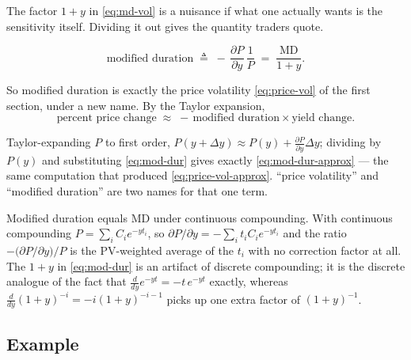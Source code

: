 
The factor $1+y$ in \eqref{eq:md-vol} is a nuisance if what one actually wants is the sensitivity itself.
Dividing it out gives the quantity traders quote.

\begin{definition}
	\begin{equation}
		\text{modified duration} \;\triangleq\; -\,\frac{\partial P}{\partial y}\,\frac{1}{P}
		\;=\; \frac{\mathrm{MD}}{1+y}. \label{eq:mod-dur}
	\end{equation}
\end{definition}

So modified duration is exactly the price volatility \eqref{eq:price-vol} of the first section, under a new name.
By the Taylor expansion,
\begin{equation}
	\text{percent price change} \;\approx\; -\,\text{modified duration} \times \text{yield change}. \label{eq:mod-dur-approx}
\end{equation}

\suppstart
\begin{note}
	Taylor-expanding $P$ to first order, $P(y+\Delta y)\approx P(y)+\frac{\partial P}{\partial y}\Delta y$; dividing by $P(y)$ and substituting \eqref{eq:mod-dur} gives exactly \eqref{eq:mod-dur-approx} --- the same computation that produced \eqref{eq:price-vol-approx}.
	 ``price volatility'' and ``modified duration'' are two names for that one term.
\end{note}
\suppend

\begin{note}
	Modified duration equals MD under continuous compounding.
\suppstart
	With continuous compounding $P=\sum_{i}C_{i}e^{-y t_{i}}$, so $\partial P/\partial y = -\sum_{i} t_{i}C_{i}e^{-yt_{i}}$ and the ratio $-\bigl(\partial P/\partial y\bigr)/P$ is the PV-weighted average of the $t_{i}$ with no correction factor at all.
	The $1+y$ in \eqref{eq:mod-dur} is an artifact of discrete compounding; it is the discrete analogue of the fact that $\frac{d}{dy}e^{-yt}=-t\,e^{-yt}$ exactly, whereas $\frac{d}{dy}(1+y)^{-i}=-i(1+y)^{-i-1}$ picks up one extra factor of $(1+y)^{-1}$.
\suppend
\end{note}

\subsection{Example}


